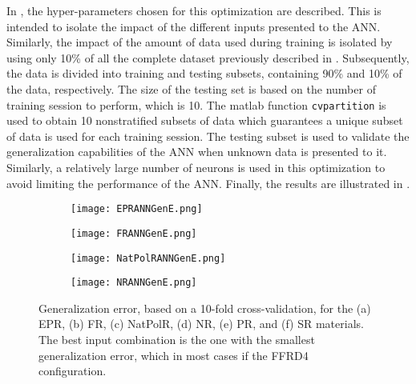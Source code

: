 In , the hyper-parameters chosen for this optimization are described. This is intended to isolate the impact of the different inputs presented to the ANN. Similarly, the impact of the amount of data used during training is isolated by using only 10\% of all the complete dataset previously described in . Subsequently, the data is divided into training and testing subsets, containing 90\% and 10\% of the data, respectively. The size of the testing set is based on the number of training session to perform, which is 10. The matlab function \texttt{cvpartition} is used to obtain 10 nonstratified subsets of data which guarantees a unique subset of data is used for each training session. The testing subset is used to validate the generalization capabilities of the ANN when unknown data is presented to it. Similarly, a relatively large number of neurons is used in this optimization to avoid limiting the performance of the ANN. Finally, the results are illustrated in .

\begin{figure}[htbp!]
	\centering
    \begin{subfigure}[b]{0.49\textwidth}
        \centering
        \texttt{[image: EPRANNGenE.png]}
        \caption{}
        \label{fig:ANNGenEPR}
    \end{subfigure}
    \begin{subfigure}[b]{0.49\textwidth}
        \centering
        \texttt{[image: FRANNGenE.png]}
        \caption{}
        \label{fig:ANNGenFR}
    \end{subfigure}
    \begin{subfigure}[b]{0.49\textwidth}
        \centering
        \texttt{[image: NatPolRANNGenE.png]}
        \caption{}
        \label{fig:ANNGenNR}
    \end{subfigure}
    \begin{subfigure}[b]{0.49\textwidth}
        \centering
        \texttt{[image: NRANNGenE.png]}
        \caption{}
        \label{fig:ANNGenNatPolR}
    \end{subfigure}
    \caption{Generalization error, based on a 10-fold cross-validation, for the (a) EPR, (b) FR, (c) NatPolR, (d) NR, (e) PR, and (f) SR materials. The best input combination is the one with the smallest generalization error, which in most cases if the FFRD4 configuration.}
    \label{fig:ANNGen4}
\end{figure}

